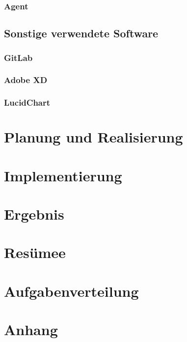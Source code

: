 \documentclass{report}
\begin{document}
\subsection{Agent}
\section{Sonstige verwendete Software}
\subsection{GitLab}
\subsection{Adobe XD}
\subsection{LucidChart}

\chapter{Planung und Realisierung}

\chapter{Implementierung}

\chapter{Ergebnis}

\chapter{Resümee}

\chapter{Aufgabenverteilung}

\chapter{Anhang}
\end{document}
